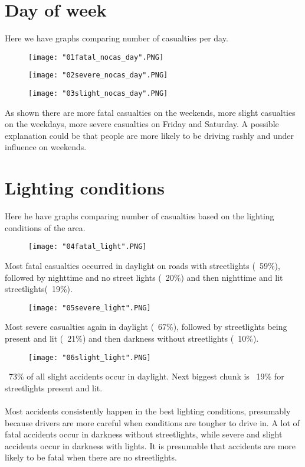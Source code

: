 \documentclass[a4paper, 12pt]{article}
\begin{document}
\section{Day of week}
Here we have graphs comparing number of casualties per day.
\begin{figure}[!h]
\texttt{[image: "01fatal\_nocas\_day".PNG]}
\end{figure}
\begin{figure}[!h]
\texttt{[image: "02severe\_nocas\_day".PNG]}
\end{figure}
\begin{figure}[!h]
\texttt{[image: "03slight\_nocas\_day".PNG]}
\end{figure}
As shown there are more fatal casualties on the weekends, more slight casualties on the weekdays, more severe casualties on Friday and Saturday. A possible explanation could be that people are more likely to be driving rashly and under influence on weekends.
\section{Lighting conditions}
Here he have graphs comparing number of casualties based on the lighting conditions of the area.
\begin{figure}[!h]
\texttt{[image: "04fatal\_light".PNG]}
\end{figure}
Most fatal casualties occurred in daylight on roads with streetlights (~59\%), followed by nighttime and no street lights (~20\%) and then nighttime and lit streetlights(~19\%). 
\begin{figure}[!h]
\texttt{[image: "05severe\_light".PNG]}
\end{figure}
Most severe casualties again in daylight (~67\%), followed by streetlights being present and lit (~21\%) and then darkness without streetlights (~10\%).
\begin{figure}[!h]
\texttt{[image: "06slight\_light".PNG]}
\end{figure}
~73\% of all slight accidents occur in daylight. Next biggest chunk is ~19\% for streetlights present and lit.
\paragraph{} Most accidents consistently happen in the best lighting conditions, presumably because drivers are more careful when conditions are tougher to drive in. A lot of fatal accidents occur in darkness without streetlights, while severe and slight accidents occur in darkness with lights. It is presumable that accidents are more likely to be fatal when there are no streetlights.
\end{document}
